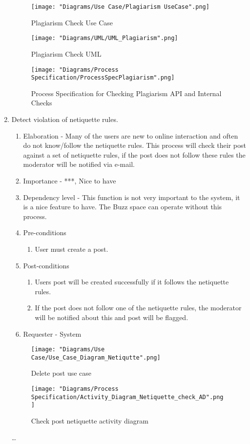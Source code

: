 \documentclass[12pt]{article}
\begin{document}
\begin{enumerate}
\begin{enumerate}
  \end{enumerate}
\begin{figure}[h]
	\centering
	\texttt{[image: "Diagrams/Use Case/Plagiarism UseCase".png]}
	\caption{Plagiarism Check Use Case}
\end{figure}
\begin{figure}[h]
	\centering
	\texttt{[image: "Diagrams/UML/UML\_Plagiarism".png]}
	\caption{Plagiarism Check UML}
\end{figure}
\begin{figure}[h]
	\centering
	\texttt{[image: "Diagrams/Process Specification/ProcessSpecPlagiarism".png]}
	\caption{Process Specification for Checking Plagiarism API and Internal Checks}
\end{figure}
\clearpage %
   \item Detect violation of netiquette rules. %
	\begin{enumerate}
  	\item Elaboration - Many of the users are new to online interaction and often do not know/follow the netiquette rules. This process will check their post against a set of netiquette rules, if the post does not follow these rules the moderator will be notified via e-mail.
   	 	\item Importance - ***, Nice to have
   	 	\item Dependency level - This function is not very important to the system, it is a nice feature to have. The Buzz space can operate without this process.
   	 	\item Pre-conditions
   		\begin{enumerate}
    		\item User must create a post.
    	\end{enumerate}
     	\item Post-conditions
    	\begin{enumerate}
  	  		\item Users post will be created successfully if it follows the netiquette rules.
  	  		\item If the post does not follow one of the netiquette rules, the moderator will be notified about this and post will be flagged.
   	 	\end{enumerate}
   	 	\item Requester - System
  	\end{enumerate}
  	\begin{figure}[h]
  		\centering
  		\texttt{[image: "Diagrams/Use Case/Use\_Case\_Diagram\_Netiqutte".png]}
  		\caption{Delete post use case}
  	\end{figure}
  	\begin{figure}[h]
  		\centering
  		\texttt{[image: "Diagrams/Process Specification/Activity\_Diagram\_Netiquette\_check\_AD".png]}
  		\caption{Check post netiquette activity diagram}
  	\end{figure}
  	\clearpage
  	\newpage
  \ldots
\end{enumerate}
\end{document}
